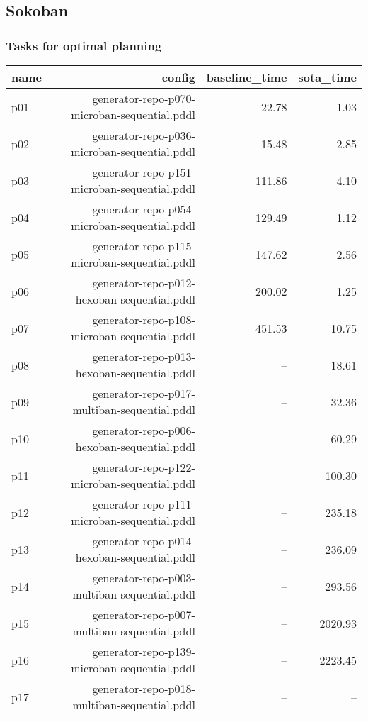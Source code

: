 \documentclass{article}
\begin{document}
                \newpage \subsection{Sokoban}
                    \subsubsection*{Tasks for optimal planning}
                    
                            \begin{center}
                            \scriptsize
                            \begin{tabular}{@{}l|r|r|r@{}}
                            name & config & baseline\_time & sota\_time\\\midrule
                              p01& generator-repo-p070-microban-sequential.pddl&22.78&1.03\\
  p02& generator-repo-p036-microban-sequential.pddl&15.48&2.85\\
  p03& generator-repo-p151-microban-sequential.pddl&111.86&4.10\\
  p04& generator-repo-p054-microban-sequential.pddl&129.49&1.12\\
  p05& generator-repo-p115-microban-sequential.pddl&147.62&2.56\\
  p06& generator-repo-p012-hexoban-sequential.pddl&200.02&1.25\\
  p07& generator-repo-p108-microban-sequential.pddl&451.53&10.75\\
  p08& generator-repo-p013-hexoban-sequential.pddl&--&18.61\\
  p09& generator-repo-p017-multiban-sequential.pddl&--&32.36\\
  p10& generator-repo-p006-hexoban-sequential.pddl&--&60.29\\
  p11& generator-repo-p122-microban-sequential.pddl&--&100.30\\
  p12& generator-repo-p111-microban-sequential.pddl&--&235.18\\
  p13& generator-repo-p014-hexoban-sequential.pddl&--&236.09\\
  p14& generator-repo-p003-multiban-sequential.pddl&--&293.56\\
  p15& generator-repo-p007-multiban-sequential.pddl&--&2020.93\\
  p16& generator-repo-p139-microban-sequential.pddl&--&2223.45\\
  p17& generator-repo-p018-multiban-sequential.pddl&--&--\\

\end{tabular}
\end{center}
\end{document}
